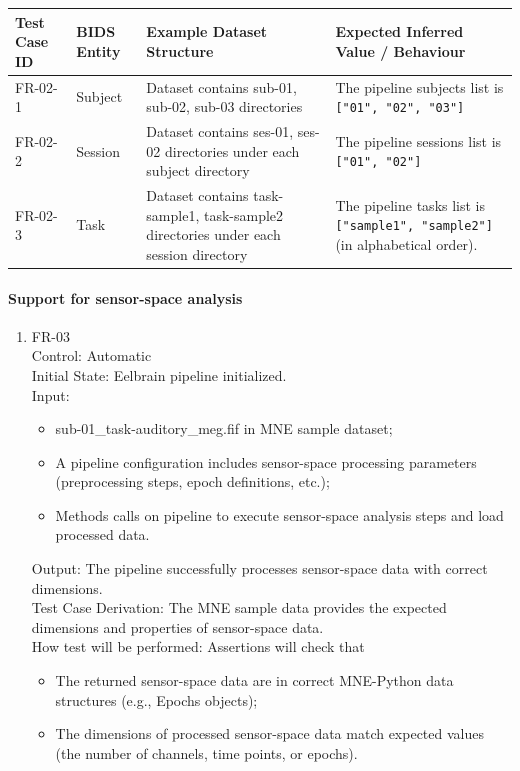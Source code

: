 \documentclass[12pt, titlepage]{article}
\begin{document}
\begin{tabularx}{\textwidth}{p{2cm}p{2cm}p{4.5cm}X}
\toprule 
    \textbf{Test Case ID} & \textbf{BIDS Entity} & \textbf{Example Dataset Structure} & \textbf{Expected Inferred Value / Behaviour} \\
\midrule
    FR-02-1 & Subject & Dataset contains sub-01, sub-02, sub-03 directories & The pipeline subjects list is \texttt{["01", "02", "03"]} \\

    FR-02-2 & Session & Dataset contains ses-01, ses-02 directories under each subject directory & The pipeline sessions list is \texttt{["01", "02"]} \\

    FR-02-3 & Task & Dataset contains task-sample1, task-sample2 directories under each session directory & The pipeline tasks list is \texttt{["sample1", "sample2"]} (in alphabetical order). \\
\bottomrule
\end{tabularx}


\paragraph{Support for sensor-space analysis}


\begin{enumerate}


\item{FR-03\\}
    Control: Automatic \\
    Initial State: Eelbrain pipeline initialized. \\
    Input:
        \begin{itemize}
            \item sub-01\_task-auditory\_meg.fif in MNE sample dataset;
            \item A pipeline configuration includes sensor-space processing parameters (preprocessing steps, epoch definitions, etc.);
            \item Methods calls on pipeline to execute sensor-space analysis steps and load processed data.
        \end{itemize}
    Output: The pipeline successfully processes sensor-space data with correct dimensions. \\
    Test Case Derivation: The MNE sample data provides the expected dimensions and properties of sensor-space data. \\
    How test will be performed: Assertions will check that
    \begin{itemize}
        \item The returned sensor-space data are in correct MNE-Python data structures (e.g., Epochs objects);
        \item The dimensions of processed sensor-space data match expected values (the number of channels, time points, or epochs).
    \end{itemize}
    


\end{enumerate}
\end{document}
